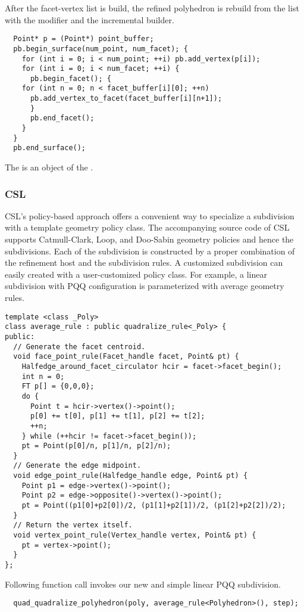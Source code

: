 After the facet-vertex list is build, 
the refined polyhedron is rebuild from the list with the 
modifier and the incremental builder.
\begin{lstlisting}
  Point* p = (Point*) point_buffer;
  pb.begin_surface(num_point, num_facet); {
    for (int i = 0; i < num_point; ++i) pb.add_vertex(p[i]);	
    for (int i = 0; i < num_facet; ++i) {
      pb.begin_facet(); {
	for (int n = 0; n < facet_buffer[i][0]; ++n)
	  pb.add_vertex_to_facet(facet_buffer[i][n+1]);
      }
      pb.end_facet();
    }
  }
  pb.end_surface();
\end{lstlisting}
The  is an object of the 
.

\subsubsection{CSL}
CSL's policy-based approach offers a convenient way to
specialize a subdivision with a template geometry policy class.
The accompanying source code of CSL supports Catmull-Clark, 
Loop, and Doo-Sabin geometry policies and hence the subdivisions. 
Each of the subdivision is constructed by a proper combination 
of the refinement host and the subdivision rules. 
A customized subdivision can easily created with a user-customized 
policy class. For example, a linear subdivision with PQQ 
configuration is parameterized with average geometry rules.
\begin{lstlisting}
template <class _Poly>
class average_rule : public quadralize_rule<_Poly> {
public:
  // Generate the facet centroid.
  void face_point_rule(Facet_handle facet, Point& pt) {
    Halfedge_around_facet_circulator hcir = facet->facet_begin();
    int n = 0;
    FT p[] = {0,0,0};
    do {
      Point t = hcir->vertex()->point();
      p[0] += t[0], p[1] += t[1], p[2] += t[2]; 
      ++n;
    } while (++hcir != facet->facet_begin());
    pt = Point(p[0]/n, p[1]/n, p[2]/n);
  }
  // Generate the edge midpoint.
  void edge_point_rule(Halfedge_handle edge, Point& pt) {
    Point p1 = edge->vertex()->point();
    Point p2 = edge->opposite()->vertex()->point();
    pt = Point((p1[0]+p2[0])/2, (p1[1]+p2[1])/2, (p1[2]+p2[2])/2);
  }
  // Return the vertex itself.
  void vertex_point_rule(Vertex_handle vertex, Point& pt) {
    pt = vertex->point();
  }
};
\end{lstlisting}
Following function call invokes our new and simple linear PQQ subdivision.
\begin{lstlisting}
  quad_quadralize_polyhedron(poly, average_rule<Polyhedron>(), step);
\end{lstlisting}

